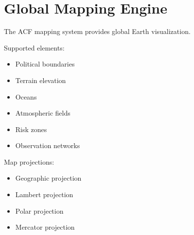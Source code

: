\section{Global Mapping Engine}


The ACF mapping system provides global Earth visualization.



Supported elements:


\begin{itemize}

\item Political boundaries

\item Terrain elevation

\item Oceans

\item Atmospheric fields

\item Risk zones

\item Observation networks

\end{itemize}



Map projections:


\begin{itemize}

\item Geographic projection

\item Lambert projection

\item Polar projection

\item Mercator projection

\end{itemize}
